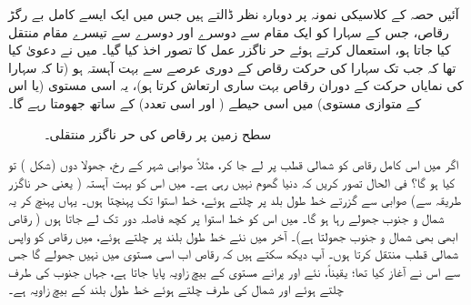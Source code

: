 آئیں حصہ  کے کلاسیکی نمونہ پر دوبارہ نظر ڈالتے ہیں جس میں ایک ایسے کامل بے رگڑ رقاص، جس کے سہارا کو ایک مقام سے دوسرے اور دوسرے سے تیسرے مقام منتقل کیا جاتا ہو، استعمال کرتے ہوئے حر ناگزر عمل کا تصور اخذ کیا گیا۔ میں نے دعویٰ کیا تھا کہ جب تک سہارا کی حرکت رقاص کے دوری عرصے سے بہت آہستہ ہو (تا کہ سہارا کی نمایاں حرکت کے دوران رقاص بہت ساری ارتعاش کرتا ہو)، یہ اسی مستوی (یا اس کے متوازی مستوی) میں اسی حیطے ( اور اسی تعدد) کے ساتھ جھومتا رہے گا۔
\begin{figure}
\centering
{}
\caption{سطح زمین پر رقاص کی حر ناگزر منتقلی۔}
\label{شکل_حرارت_نا_گزر_سطح_زمین_منتقل}
\end{figure}



 اگر میں اس کامل رقاص کو شمالی قطب پر لے جا کر، مثلاً صوابی شہر کے رخ، جھولا دوں (شکل ) تو کیا ہو گا؟ فی الحال تصور کریں کہ دنیا گھوم نہیں رہی ہے۔ میں اس کو بہت آہستہ ( یعنی حر ناگزر طریقہ سے) صوابی سے گزرتے خط طول بلد پر چلتے ہوئے، خط استوا تک پہنچتا ہوں۔ یہاں پہنچ کر یہ شمال و جنوب جھولے رہا ہو گا۔ میں اس کو خط استوا پر کچھ فاصلہ دور تک لے جاتا ہوں ( رقاص ابھی بھی شمال و جنوب جھولتا ہے)۔ آخر میں نئے خط طول بلند پر چلتے ہوئے، میں رقاص کو واپس شمالی قطب منتقل کرتا ہوں۔ آپ دیکھ سکتے ہیں کہ رقاص اب اسی مستوی میں نہیں جھولے گا جس سے اس نے آغاز کیا تھا؛ یقیناً، نئے اور پرانے مستوی کے بیچ زاویہ  پایا جاتا ہے، جہاں جنوب کی طرف چلتے ہوئے اور شمال کی طرف چلتے ہوئے خط طول بلند کے بیچ زاویہ  ہے۔ 
 
